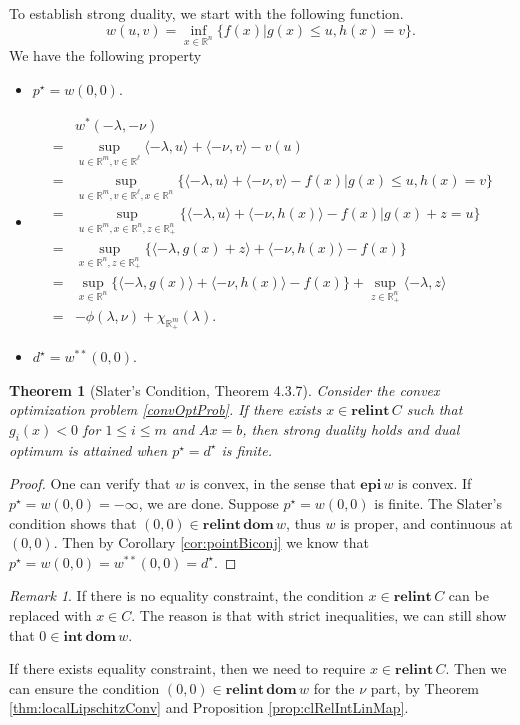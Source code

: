\documentclass[openany]{book}
\newtheorem{theorem}{Theorem}[chapter]
\theoremstyle{definition}
\theoremstyle{remark}
\newtheorem*{remark}{Remark}
\begin{document}
To establish strong duality, we start with the following function.
\begin{equation}
    w(u,v)=\inf_{x\in \mathbb{R}^n}\{f(x)|g(x)\le u,h(x)=v\}.
\end{equation}
We have the following property
\begin{itemize}
    \item $p^{\star}=w(0,0)$.
    \item \begin{align*}
                & w^*(-\lambda,-\nu) \\
               = & \sup_{u\in \mathbb{R}^m,v\in \mathbb{R}^{\ell}}\langle-\lambda,u\rangle+\langle-\nu,v\rangle-v(u) \\
               = & \sup_{u\in \mathbb{R}^m,v\in \mathbb{R}^{\ell},x\in \mathbb{R}^n}\{\langle-\lambda,u\rangle+\langle-\nu,v\rangle-f(x)|g(x)\le u,h(x)=v\} \\
               = & \sup_{u\in \mathbb{R}^m,x\in \mathbb{R}^n,z\in \mathbb{R}_+^n}\{\langle-\lambda,u\rangle+\langle-\nu,h(x)\rangle-f(x)|g(x)+z=u\} \\
               = & \sup_{x\in \mathbb{R}^n,z\in \mathbb{R}_+^n}\{\langle-\lambda,g(x)+z\rangle+\langle-\nu,h(x)\rangle-f(x)\} \\
               = & \sup_{x\in \mathbb{R}^n}\{\langle-\lambda,g(x)\rangle+\langle-\nu,h(x)\rangle-f(x)\}+\sup_{z\in \mathbb{R}_+^n}\langle-\lambda,z\rangle \\
               = & -\phi(\lambda,\nu)+\chi_{\mathbb{R}_+^m}(\lambda).
          \end{align*}
    \item $d^{\star}=w^{**}(0,0)$.
\end{itemize}
\begin{theorem}[Slater's Condition, \cite{BL10} Theorem 4.3.7]
    Consider the convex optimization problem \eqref{convOptProb}. If there exists $x\in\mathbf{relint}\,C$ such that $g_i(x)<0$ for $1\le i\le m$ and $Ax=b$, then strong duality holds and dual optimum is attained when $p^{\star}=d^{\star}$ is finite.
\end{theorem}
\begin{proof}
    One can verify that $w$ is convex, in the sense that $\mathbf{epi}\,w$ is convex. If $p^{\star}=w(0,0)=-\infty$, we are done. Suppose $p^{\star}=w(0,0)$ is finite. The Slater's condition shows that $(0,0)\in \mathbf{relint}\,\mathbf{dom}\,w$, thus $w$ is proper, and continuous at $(0,0)$. Then by Corollary \ref{cor:pointBiconj} we know that $p^{\star}=w(0,0)=w^{**}(0,0)=d^{\star}$.
\end{proof}
\begin{remark}
    If there is no equality constraint, the condition $x\in \mathbf{relint}\,C$ can be replaced with $x\in C$. The reason is that with strict inequalities, we can still show that $0\in \mathbf{int}\,\mathbf{dom}\,w$.

    If there exists equality constraint, then we need to require $x\in \mathbf{relint}\,C$. Then we can ensure the condition $(0,0)\in \mathbf{relint}\,\mathbf{dom}\,w$ for the $\nu$ part, by Theorem \ref{thm:localLipschitzConv} and Proposition \ref{prop:clRelIntLinMap}.
\end{remark}
\end{document}
